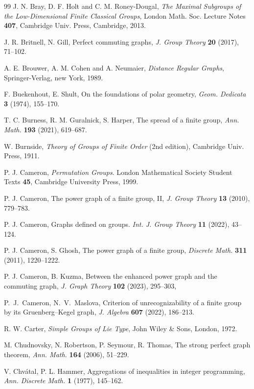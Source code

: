 \documentclass{elsarticle}
\begin{document}
\begin{thebibliography}{99}
J. N. Bray, D. F. Holt and C. M. Roney-Dougal,
\textit{The Maximal Subgroups of the Low-Dimensional Finite Classical Groups},
London Math. Soc. Lecture Notes \textbf{407}, Cambridge Univ. Press,
Cambridge, 2013.

J. R. Britnell, N. Gill,
Perfect commuting graphs,
\textit{J. Group Theory} \textbf{20} (2017), 71--102.

A. E. Brouwer, A. M. Cohen and A. Neumaier,
\textit{Distance Regular Graphs},
Springer-Verlag, new York, 1989.

F. Buekenhout, E. Shult,
On the foundations of polar geometry,
\textit{Geom. Dedicata} \textbf{3} (1974), 155--170.

T. C. Burness, R. M. Guralnick, S. Harper,
The spread of a finite group,
\textit{Ann. Math.} \textbf{193} (2021), 619--687.

W. Burnside,
\textit{Theory of Groups of Finite Order} (2nd edition),
Cambridge Univ. Press, 1911.

P. J. Cameron,
\textit{Permutation Groups}.
London Mathematical Society Student Texts \textbf{45},
Cambridge University Press, 1999.

P. J. Cameron,
The power graph of a finite group, II,
\textit{J. Group Theory} \textbf{13} (2010), 779--783.

P. J. Cameron,
Graphs defined on groups.
\textit{Int. J. Group Theory} \textbf{11} (2022), 43--124.

P. J. Cameron, S. Ghosh,
The power graph of a finite group,
\textit{Discrete Math.} \textbf{311} (2011), 1220--1222.

P. J. Cameron, B. Kuzma,
Between the enhanced power graph and the commuting graph,
\textit{J. Graph Theory} \textbf{102} (2023), 295--303,

P.~J.~Cameron, N.~V.~Maslova,
Criterion of unrecognizability of a finite group by its Gruenberg--Kegel graph,
\textit{J. Algebra} \textbf{607} (2022), 186--213.

R. W. Carter,
\textit{Simple Groups of Lie Type},
John Wiley \& Sons, London, 1972.

M. Chudnovsky, N. Robertson, P. Seymour, R. Thomas,
The strong perfect graph theorem,
\textit{Ann. Math.} \textbf{164} (2006), 51--229.

V. Chv\'atal, P. L. Hammer,
Aggregations of inequalities in integer programming,
\textit{Ann. Discrete Math.} \textbf{1} (1977), 145--162.


\end{thebibliography}
\end{document}

